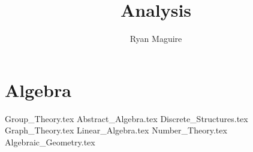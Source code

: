 \documentclass[crop=false,class=book,oneside]{standalone}
\begin{document}
    \newif\ifmathcourses
    \ifx\ifmain\undefined
        \title{Analysis}
        \author{Ryan Maguire}
        \date{\vspace{-5ex}}
        \maketitle
        \tableofcontents
        \listoffigures
        \listoftables
        \clearpage
    \fi
    \part{Algebra}
        {Group_Theory.tex}
        {Abstract_Algebra.tex}
        {Discrete_Structures.tex}
        {Graph_Theory.tex}
        {Linear_Algebra.tex}
        {Number_Theory.tex}
        {Algebraic_Geometry.tex}
\end{document}
